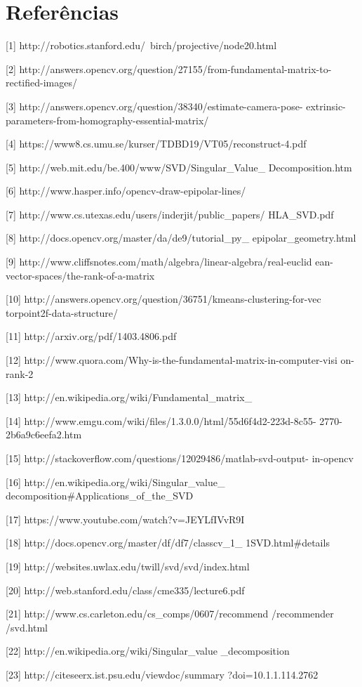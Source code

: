 \documentclass[conference]{IEEEtran}
\begin{document}
\section{Refer\^encias} 
\label{sec:meth} 

[1] http://robotics.stanford.edu/~birch/projective/node20.html

[2] http://answers.opencv.org/question/27155/from-fundamental-matrix-to-rectified-images/

[3] http://answers.opencv.org/question/38340/estimate-camera-pose-
extrinsic-parameters-from-homography-essential-matrix/

[4] https://www8.cs.umu.se/kurser/TDBD19/VT05/reconstruct-4.pdf

[5] http://web.mit.edu/be.400/www/SVD/Singular\_Value\_
Decomposition.htm

[6] http://www.hasper.info/opencv-draw-epipolar-lines/

[7] http://www.cs.utexas.edu/users/inderjit/public\_papers/
HLA\_SVD.pdf

[8] http://docs.opencv.org/master/da/de9/tutorial\_py\_
epipolar\_geometry.html

[9] http://www.cliffsnotes.com/math/algebra/linear-algebra/real-euclid
ean-vector-spaces/the-rank-of-a-matrix

[10] http://answers.opencv.org/question/36751/kmeans-clustering-for-vec
torpoint2f-data-structure/

[11] http://arxiv.org/pdf/1403.4806.pdf

[12] http://www.quora.com/Why-is-the-fundamental-matrix-in-computer-visi
on-rank-2

[13] http://en.wikipedia.org/wiki/Fundamental\_matrix\_

[14] http://www.emgu.com/wiki/files/1.3.0.0/html/55d6f4d2-223d-8c55-
2770-2b6a9c6eefa2.htm

[15] http://stackoverflow.com/questions/12029486/matlab-svd-output-
in-opencv

[16] http://en.wikipedia.org/wiki/Singular\_value\_
decomposition\#Applications\_of\_the\_SVD

[17] https://www.youtube.com/watch?v=JEYLfIVvR9I

[18] http://docs.opencv.org/master/df/df7/classcv\_1\_
1SVD.html\#details

[19] http://websites.uwlax.edu/twill/svd/svd/index.html

[20] http://web.stanford.edu/class/cme335/lecture6.pdf

[21] http://www.cs.carleton.edu/cs\_comps/0607/recommend
/recommender
/svd.html

[22] http://en.wikipedia.org/wiki/Singular\_value
\_decomposition

[23] http://citeseerx.ist.psu.edu/viewdoc/summary
?doi=10.1.1.114.2762
\end{document}
